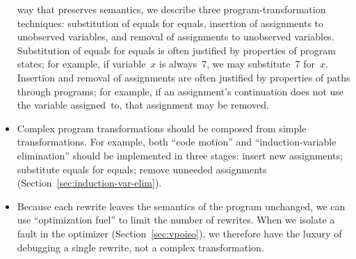 \documentclass[blockstyle,preprint,natbib,nocopyrightspace]{sigplanconf}
\def\finalremark#1{\relax}
\newcommand\secref[1]{Section~\ref{sec:#1}}
\begin{document}
\begin{itemize}
way that preserves semantics, we describe
three program-transformation techniques:
substitution of equals for equals, 
insertion of assignments to unobserved variables, 
and removal of assignments to unobserved variables. 
Substitution of equals for equals is often justified by properties of program
states; for example, if variable~$x$
is always~7, we may substitute~7 for~$x$.\finalremark
{We can also justify substitution of \emph{labels} in goto
  statements by reasoning about continuations.  This is
  probably not the place to mention this fact.}
Insertion and removal of assignments are often justified by properties
of paths through programs;
for example, if an assignment's continuation does not use the variable
assigned~to, that assignment may be removed.

\item
Complex program transformations should be composed from simple
transformations. 
For example, both ``code motion'' and ``induction-variable
elimination'' should be implemented in three stages: insert new assignments;
substitute equals for equals; remove unneeded assignments
(\secref{induction-var-elim}). 

\item 
Because each rewrite leaves the semantics
of the program unchanged, 
we can use 
``optimization fuel'' to limit the number of rewrites.
 When we isolate a fault in the optimizer
(\secref{vpoiso}), we therefore have the luxury of debugging a single
 rewrite, not a complex transformation.
\end{itemize}
\end{document}
